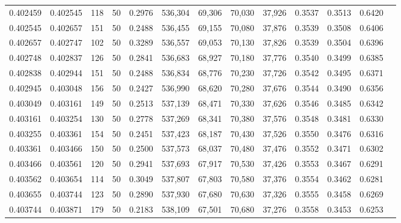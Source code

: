 \begin{tabular}{rrrrrrrrrrrrr}
0.402459 & 0.402545 &   118 &  50 &                                     0.2976 & 536,304 &  69,306 &  70,030 &  37,926 & 0.3537 & 0.3513 & 0.6420 \\
0.402545 & 0.402657 &   151 &  50 &                                     0.2488 & 536,455 &  69,155 &  70,080 &  37,876 & 0.3539 & 0.3508 & 0.6406 \\
0.402657 & 0.402747 &   102 &  50 &                                     0.3289 & 536,557 &  69,053 &  70,130 &  37,826 & 0.3539 & 0.3504 & 0.6396 \\
0.402748 & 0.402837 &   126 &  50 &                                     0.2841 & 536,683 &  68,927 &  70,180 &  37,776 & 0.3540 & 0.3499 & 0.6385 \\
0.402838 & 0.402944 &   151 &  50 &                                     0.2488 & 536,834 &  68,776 &  70,230 &  37,726 & 0.3542 & 0.3495 & 0.6371 \\
0.402945 & 0.403048 &   156 &  50 &                                     0.2427 & 536,990 &  68,620 &  70,280 &  37,676 & 0.3544 & 0.3490 & 0.6356 \\
0.403049 & 0.403161 &   149 &  50 &                                     0.2513 & 537,139 &  68,471 &  70,330 &  37,626 & 0.3546 & 0.3485 & 0.6342 \\
0.403161 & 0.403254 &   130 &  50 &                                     0.2778 & 537,269 &  68,341 &  70,380 &  37,576 & 0.3548 & 0.3481 & 0.6330 \\
0.403255 & 0.403361 &   154 &  50 &                                     0.2451 & 537,423 &  68,187 &  70,430 &  37,526 & 0.3550 & 0.3476 & 0.6316 \\
0.403361 & 0.403466 &   150 &  50 &                                     0.2500 & 537,573 &  68,037 &  70,480 &  37,476 & 0.3552 & 0.3471 & 0.6302 \\
0.403466 & 0.403561 &   120 &  50 &                                     0.2941 & 537,693 &  67,917 &  70,530 &  37,426 & 0.3553 & 0.3467 & 0.6291 \\
0.403562 & 0.403654 &   114 &  50 &                                     0.3049 & 537,807 &  67,803 &  70,580 &  37,376 & 0.3554 & 0.3462 & 0.6281 \\
0.403655 & 0.403744 &   123 &  50 &                                     0.2890 & 537,930 &  67,680 &  70,630 &  37,326 & 0.3555 & 0.3458 & 0.6269 \\
0.403744 & 0.403871 &   179 &  50 &                                     0.2183 & 538,109 &  67,501 &  70,680 &  37,276 & 0.3558 & 0.3453 & 0.6253 \\

\end{tabular}
